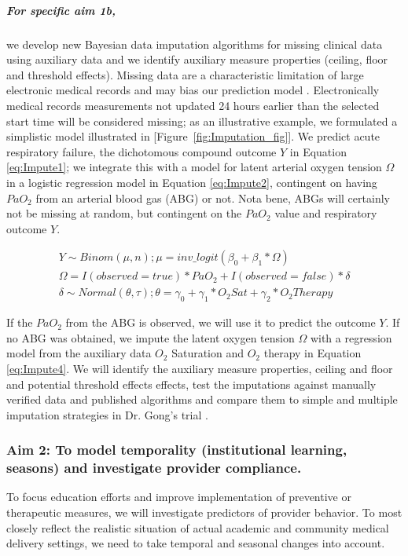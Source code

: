 \documentclass[11pt,notitlepage]{article}
\begin{document}
\subparagraph*{For specific aim 1b,} we develop new Bayesian data imputation algorithms for missing clinical data using auxiliary data and we identify auxiliary measure properties (ceiling, floor and threshold effects). Missing data are a characteristic limitation of large electronic medical records and may bias our prediction model \cite{Dean_19279318}. Electronically medical records measurements not updated 24 hours earlier than the selected start time will be considered missing;  as an illustrative example, we formulated a simplistic model illustrated in [Figure~\ref{fig:Imputation_fig}]. We predict acute respiratory failure, the dichotomous compound outcome $Y$ in Equation \ref{eq:Impute1}; we integrate this with a model for latent arterial oxygen tension $\Omega$ in a logistic regression model in Equation \ref{eq:Impute2}, contingent on having $PaO_{2}$ from an arterial blood gas (ABG) or not. Nota bene, ABGs will certainly not be missing at random, but contingent on the $PaO_2$ value and respiratory outcome $Y$. 

\begin{figure} 
\vspace{-25pt}
\begin{align} \label{eq:Impute1}
Y \sim Binom(\mu, n); \mu = inv\_logit(\beta_{0} + \beta_{1} * \Omega) \\ \label{eq:Impute2}
\Omega =  I(observed = true) * PaO_{2}   +   I(observed = false) * \delta  \\ 
\delta \sim Normal(\theta, \tau); \theta = \gamma_{0} + \gamma_{1}* O_{2} Sat + \gamma_{2} * O_{2} Therapy \label{eq:Impute4}
\end{align}
\vspace{-35pt}
\end{figure}

\vspace{5pt} If the $PaO_{2}$ from the ABG is observed, we will use it to predict the outcome $Y$. If no ABG was obtained, we impute the latent oxygen tension $\Omega$ with a regression model from the auxiliary data  $O_{2}$ Saturation and $O_{2}$ therapy in Equation \ref{eq:Impute4}. We will identify the auxiliary measure properties, ceiling and floor and potential threshold effects effects, test the imputations against manually verified data and published algorithms and compare them to  simple and multiple imputation strategies in Dr. Gong's trial \cite{Huntington_16311133,Sloan_15027501}.  

\subsubsection*{Aim 2: To model temporality (institutional learning, seasons) and investigate provider compliance.}
To focus education efforts and improve implementation of preventive or therapeutic measures, we will investigate predictors of provider behavior. To most closely reflect the realistic situation of actual academic and community medical delivery settings, we need to take temporal and seasonal changes into account. 
  
\end{document}
